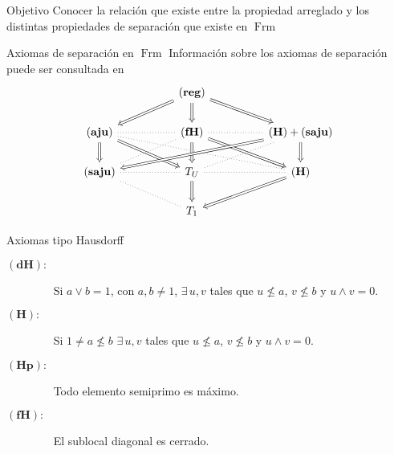 \documentclass[compress,12pt]{beamer}
\DeclareMathOperator{\Frm}{Frm}
\begin{document}
\begin{frame}{Objetivo}
    \Huge{Conocer la relación que existe entre la propiedad arreglado y los distintas propiedades de separación que existe en $\Frm$}

\end{frame}

\begin{frame}{Axiomas de separación en $\Frm$}
    Información sobre los axiomas de separación puede ser consultada en \cite{J.P.2}
	\[\begin{tikzcd}
	&& {\mathbf{(reg)}} \\
	{\mathbf{(aju)}} && {\mathbf{(fH)}} && {\mathbf{(H)}+\mathbf{(saju)}} \\
	{\mathbf{(saju)}} && {T_U} && {\mathbf{(H)}} \\
	&& {T_1}
	\arrow[Rightarrow, from=1-3, to=2-1]
	\arrow[Rightarrow, from=1-3, to=2-3]
	\arrow[Rightarrow, from=1-3, to=2-5]
	\arrow[dotted, no head, from=2-1, to=2-3]
	\arrow[Rightarrow, from=2-1, to=3-1]
	\arrow[Rightarrow, from=2-1, to=3-3]
	\arrow[dotted, no head, from=2-1, to=3-5]
	\arrow[dotted, no head, from=2-3, to=2-5]
	\arrow[dotted, no head, from=2-3, to=3-1]
	\arrow[Rightarrow, from=2-3, to=3-3]
	\arrow[Rightarrow, from=2-3, to=3-5]
	\arrow[Rightarrow, from=2-5, to=3-1]
	\arrow[dotted, no head, from=2-5, to=3-3]
	\arrow[Rightarrow, from=2-5, to=3-5]
	\arrow[dotted, no head, from=3-1, to=3-3]
	\arrow[dotted, no head, from=3-1, to=4-3]
	\arrow[dotted, no head, from=3-3, to=3-5]
	\arrow[Rightarrow, from=3-3, to=4-3]
	\arrow[Rightarrow, from=3-5, to=4-3]
\end{tikzcd}\]
\end{frame}

\begin{frame}{Axiomas tipo Hausdorff}
    \begin{description}
        \item[$\mathbf{(dH):}$]$\quad$ Si $a\vee b=1$, con $a,b\neq 1$, $\exists\, u,v$ tales que $u\nleq a$, $v\nleq b$ y $u\wedge v=0$.
        \item[$\mathbf{(H):}$]$\quad$ Si $1\neq a\nleq b$ $\exists\, u, v$ tales que $u\nleq a$, $v\nleq b$ y $u\wedge v=0$.
        \item[$\mathbf{(Hp):}$]$\quad$ Todo elemento semiprimo es máximo.
        \item[$\mathbf{(fH):}$]$\quad$ El sublocal diagonal es cerrado.
    \end{description}
\end{frame}
\end{document}
